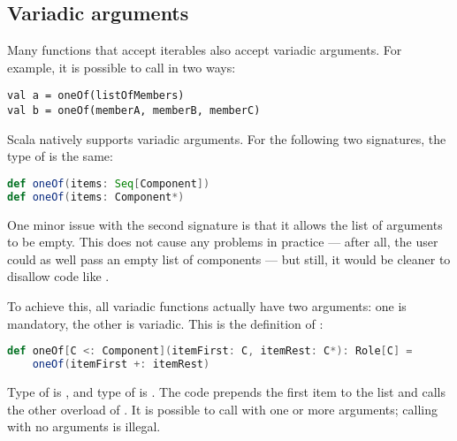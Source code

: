 
\subsection{Variadic arguments}

Many functions that accept iterables also accept variadic arguments. For example, it is
possible to call  in two ways:
\begin{lstlisting}[style=snippet]
val a = oneOf(listOfMembers)
val b = oneOf(memberA, memberB, memberC)
\end{lstlisting}

Scala natively supports variadic arguments. For the following two signatures, the type
of  is the same:
\begin{lstlisting}[style=snippet, language=Scala]
def oneOf(items: Seq[Component])
def oneOf(items: Component*)
\end{lstlisting}

One minor issue with the second signature is that it allows the list of arguments to be
empty. This does not cause any problems in practice --- after all, the user could as
well pass an empty list of components --- but still, it would be cleaner to disallow
code like .

To achieve this, all variadic functions actually have two arguments: one is mandatory,
the other is variadic. This is the definition of :
\begin{lstlisting}[style=ensembles, language=Scala]
def oneOf[C <: Component](itemFirst: C, itemRest: C*): Role[C] =
    oneOf(itemFirst +: itemRest)
\end{lstlisting}
Type of  is , and type of  is . The code
prepends the first item to the list and calls the other overload of . It is
possible to call  with one or more arguments; calling with no arguments is
illegal.
